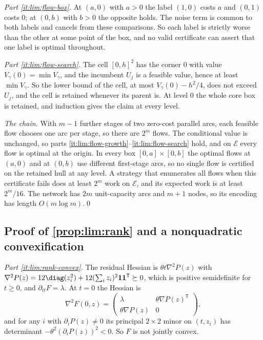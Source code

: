 \emph{Part \ref{it:lim:flow-box}.} At $(a,0)$ with $a>0$ the label $(1,0)$
costs $a$ and $(0,1)$ costs $0$; at $(0,b)$ with $b>0$ the opposite holds.
The noise term is common to both labels and cancels from these comparisons.
So each label is strictly worse than the other at some point of the box,
and no valid certificate can assert that one label is optimal throughout.

\emph{Part \ref{it:lim:flow-search}.} The cell $[0,h]^2$ has the corner $0$
with value $V_\gamma(0)=\min V_\gamma$, and the incumbent $U_j$ is a
feasible value, hence at least $\min V_\gamma$. So the lower bound of the
cell, at most $V_\gamma(0)-h^2/4$, does not exceed $U_j$, and the cell is
retained whenever its parent is. At level $0$ the whole core box is
retained, and induction gives the claim at every level.

\emph{The chain.} With $m-1$ further stages of two zero-cost parallel arcs,
each feasible flow chooses one arc per stage, so there are $2^m$ flows. The
conditional value is unchanged, so parts
\ref{it:lim:flow-growth}--\ref{it:lim:flow-search} hold, and on
$\mathcal E$ every flow is optimal at the origin. In every box
$[0,a]\times[0,b]$ the optimal flows at $(a,0)$ and at $(0,b)$ use
different first-stage arcs, so no single flow is certified on the retained
hull at any level. A strategy that enumerates all flows when this
certificate fails does at least $2^m$ work on $\mathcal E$, and its
expected work is at least $2^m/16$. The network has $2m$ unit-capacity arcs
and $m+1$ nodes, so its encoding has length $O(m\log m)$.\qed

\subsection{Proof of \texorpdfstring{\cref{prop:lim:rank}}{the rank-separation proposition} and a nonquadratic convexification}\label{app:lim:rank}

\emph{Part \ref{it:lim:rank-convex}.} The residual Hessian is
$\theta t\nabla^2P(z)$ with
$\nabla^2P(z)=12\diag(z_i^2)+12(\sum_iz_i)^2\mathbf1\mathbf1^{\mathsf T}\succeq0$,
which is positive semidefinite for $t\ge0$, and $\partial_{tt}F=\lambda$.
At $t=0$ the Hessian is
\begin{equation}\label{eq:lim:rank-hessian}
 \nabla^2F(0,z)=\begin{pmatrix}\lambda&\theta\nabla P(z)^{\mathsf T}\\
 \theta\nabla P(z)&0\end{pmatrix},
\end{equation}
and for any $i$ with $\partial_iP(z)\ne0$ its principal $2\times2$ minor on
$(t,z_i)$ has determinant $-\theta^2(\partial_iP(z))^2<0$. So $F$ is not
jointly convex.

